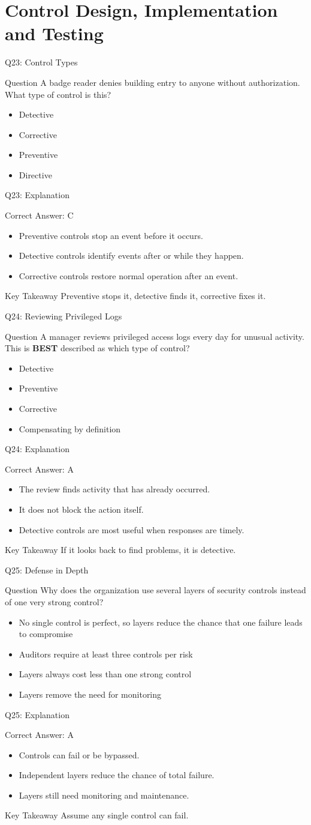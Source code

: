 \documentclass[aspectratio=169]{beamer}
\newcommand{\hq}[7]{%
	\begin{frame}{Q#1: #2}
		\begin{block}{Question}
			#3
		\end{block}
		\begin{itemize}
			#4
		\end{itemize}
	\end{frame}
	\begin{frame}{Q#1: Explanation}
		\begin{block}{Correct Answer: #5}
			\begin{itemize}
				#6
			\end{itemize}
		\end{block}
		\begin{alertblock}{Key Takeaway}
			#7
		\end{alertblock}
	\end{frame}
}
\begin{document}
	\section{Control Design, Implementation and Testing}
	
	\hq{23}{Control Types}
	{A badge reader denies building entry to anyone without authorization. What type of control is this?}
	{\item[\textbf{(A)}] Detective
		\item[\textbf{(B)}] Corrective
		\item[\textbf{(C)}] Preventive
		\item[\textbf{(D)}] Directive}
	{C}
	{\item Preventive controls stop an event before it occurs.
		\item Detective controls identify events after or while they happen.
		\item Corrective controls restore normal operation after an event.}
	{Preventive stops it, detective finds it, corrective fixes it.}
	
	\hq{24}{Reviewing Privileged Logs}
	{A manager reviews privileged access logs every day for unusual activity. This is \textbf{BEST} described as which type of control?}
	{\item[\textbf{(A)}] Detective
		\item[\textbf{(B)}] Preventive
		\item[\textbf{(C)}] Corrective
		\item[\textbf{(D)}] Compensating by definition}
	{A}
	{\item The review finds activity that has already occurred.
		\item It does not block the action itself.
		\item Detective controls are most useful when responses are timely.}
	{If it looks back to find problems, it is detective.}
	
	\hq{25}{Defense in Depth}
	{Why does the organization use several layers of security controls instead of one very strong control?}
	{\item[\textbf{(A)}] No single control is perfect, so layers reduce the chance that one failure leads to compromise
		\item[\textbf{(B)}] Auditors require at least three controls per risk
		\item[\textbf{(C)}] Layers always cost less than one strong control
		\item[\textbf{(D)}] Layers remove the need for monitoring}
	{A}
	{\item Controls can fail or be bypassed.
		\item Independent layers reduce the chance of total failure.
		\item Layers still need monitoring and maintenance.}
	{Assume any single control can fail.}
	
\end{document}
